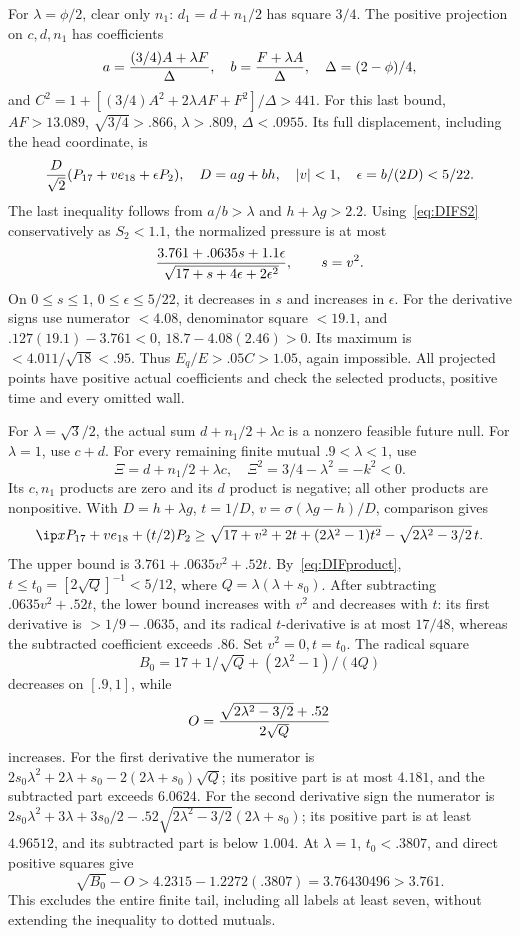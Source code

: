 For \(\lambda=\phi/2\), clear only \(n_1\):
\(d_1=d+n_1/2\) has square \(3/4\).
The positive projection on \(c,d,n_1\) has coefficients
\[
 a={(3/4)A+\lambda F\over\Delta},\quad
 b={F+\lambda A\over\Delta},\quad
 \Delta=(2-\phi)/4,
\]
and
\(C^2=1+[(3/4)A^2+2\lambda AF+F^2]/\Delta>441\).
For this last bound, \(AF>13.089\),
\(\sqrt{3/4}>.866\), \(\lambda>.809\), \(\Delta<.0955\).
Its full displacement, including the head coordinate, is
\[
 {D\over\sqrt2}
   (P_{17}+ve_{18}+\epsilon P_2),\quad
 D=ag+bh,\quad |v|<1,\quad \epsilon=b/(2D)<5/22.
\]
The last inequality follows from \(a/b>\lambda\) and
\(h+\lambda g>2.2\).
Using~\eqref{eq:DIFS2} conservatively as \(S_2<1.1\),
the normalized pressure is at most
\[
 {3.761+.0635s+1.1\epsilon
       \over\sqrt{17+s+4\epsilon+2\epsilon^2}},\qquad s=v^2.
\]
On \(0\le s\le1\), \(0\le\epsilon\le5/22\), it decreases
in \(s\) and increases in \(\epsilon\).
For the derivative signs use numerator \(<4.08\),
denominator square \(<19.1\), and
\(.127(19.1)-3.761<0\),
\(18.7-4.08(2.46)>0\).
Its maximum is \(<4.011/\sqrt{18}<.95\).
Thus \(E_q/E>.05C>1.05\), again impossible.
All projected points have positive actual coefficients and check
the selected products, positive time and every omitted wall.

For \(\lambda=\sqrt3/2\), the actual sum
\(d+n_1/2+\lambda c\) is a nonzero feasible future null.
For \(\lambda=1\), use \(c+d\).
For every remaining finite mutual \(.9<\lambda<1\), use
\[
 \Xi=d+n_1/2+\lambda c,\quad
 \Xi^2=3/4-\lambda^2=-k^2<0 .
\]
Its \(c,n_1\) products are zero and its \(d\) product is negative;
all other products are nonpositive.
With \(D=h+\lambda g\), \(t=1/D\),
\(v=\sigma(\lambda g-h)/D\), comparison gives
\[
 \ip x{P_{17}+ve_{18}+(t/2)P_2}
 \ge\sqrt{17+v^2+2t+(2\lambda^2-1)t^2}
                         -\sqrt{2\lambda^2-3/2}\,t .
\]
The upper bound is
\(3.761+.0635v^2+.52t\).
By~\eqref{eq:DIFproduct},
\(t\le t_0=[2\sqrt{Q}]^{-1}<5/12\), where
\(Q=\lambda(\lambda+s_0)\).
After subtracting \(.0635v^2+.52t\), the lower bound increases
with \(v^2\) and decreases with \(t\):
its first derivative is \(>1/9-.0635\), and its radical
\(t\)-derivative is at most \(17/48\), whereas the subtracted
coefficient exceeds \(.86\).
Set \(v^2=0,t=t_0\).
The radical square
\[
 B_0=17+1/\sqrt Q+(2\lambda^2-1)/(4Q)
\]
decreases on \([.9,1]\), while
\[
 O={\sqrt{2\lambda^2-3/2}+.52\over2\sqrt Q}
\]
increases.
For the first derivative the numerator is
\(2s_0\lambda^2+2\lambda+s_0
 -2(2\lambda+s_0)\sqrt Q\);
its positive part is at most \(4.181\), and the subtracted
part exceeds \(6.0624\).
For the second derivative sign the numerator is
\(2s_0\lambda^2+3\lambda+3s_0/2
 -.52\sqrt{2\lambda^2-3/2}(2\lambda+s_0)\);
its positive part is at least \(4.96512\), and its subtracted
part is below \(1.004\).
At \(\lambda=1\), \(t_0<.3807\), and direct positive squares give
\[
 \sqrt{B_0}-O>
 4.2315-1.2272(.3807)=3.76430496>3.761 .
\]
This excludes the entire finite tail, including all labels at least
seven, without extending the inequality to dotted mutuals.

